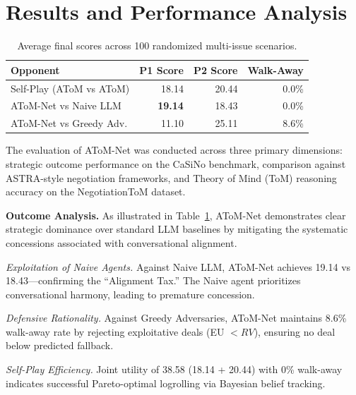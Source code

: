 \documentclass[11pt]{article}
\begin{document}
\section{Results and Performance Analysis}
\begin{table}[t]
\centering
\renewcommand{\arraystretch}{1.2}

\begin{tabular}{lrrr}
\toprule
\textbf{Opponent} & \textbf{P1 Score} & \textbf{P2 Score} & \textbf{Walk-Away} \\
\midrule
Self-Play (AToM vs AToM) & 18.14 & 20.44 & 0.0\% \\
AToM-Net vs Naive LLM    & \textbf{19.14} & 18.43 & 0.0\% \\
AToM-Net vs Greedy Adv.  & 11.10 & 25.11 & 8.6\% \\
\bottomrule
\end{tabular}
\caption{Average final scores across 100 randomized multi-issue scenarios.}
\label{tab:main_results}
\end{table}

The evaluation of AToM-Net was conducted across three primary dimensions: strategic outcome
performance on the CaSiNo benchmark, comparison against ASTRA-style negotiation frameworks, and Theory of Mind (ToM) reasoning accuracy on the
NegotiationToM dataset.

\textbf{Outcome Analysis.} 
As illustrated in Table~\ref{tab:main_results}, AToM-Net demonstrates clear strategic dominance
over standard LLM baselines by mitigating the systematic concessions associated with
conversational alignment.

\textit{Exploitation of Naive Agents.} Against Naive LLM, AToM-Net achieves 19.14 vs 18.43—confirming the ``Alignment Tax.'' The Naive agent prioritizes conversational harmony, leading to premature concession.

\textit{Defensive Rationality.} Against Greedy Adversaries, AToM-Net maintains 8.6\% walk-away rate by rejecting exploitative deals (EU $< RV$), ensuring no deal below predicted fallback.

\textit{Self-Play Efficiency.} Joint utility of 38.58 (18.14 + 20.44) with 0\% walk-away indicates successful Pareto-optimal logrolling via Bayesian belief tracking.
\end{document}
